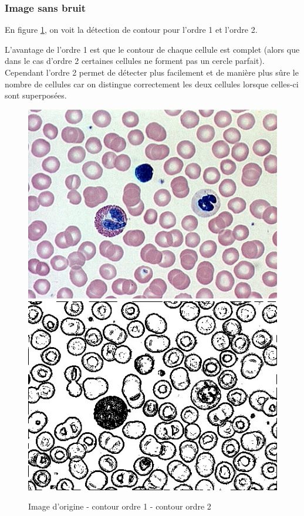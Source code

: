 \documentclass[paper=a4, fontsize=11pt]{scrartcl} %
\begin{document}
\subsubsection{Image sans bruit}
En figure \ref{comparaisonnormale}, on voit la détection de contour pour l'ordre 1 et l'ordre 2. 

L'avantage de l'ordre 1 est que le contour de chaque cellule est complet (alors que dans le cas d'ordre 2 certaines cellules ne forment pas un cercle parfait). Cependant l'ordre 2 permet de détecter plus facilement et de manière plus sûre le nombre de cellules car on distingue correctement les deux cellules lorsque celles-ci sont superposées.

\begin{figure}
\centering
\caption{Image d'origine - contour ordre 1 - contour ordre 2}
\label{comparaisonnormale}
\includegraphics[scale=1.25]{images/rapport/blood.jpg} 
\includegraphics[scale=0.3]{images/rapport/blood1.jpg} 

\end{figure}
\end{document}
